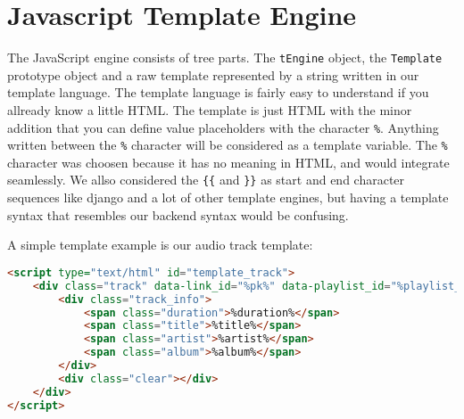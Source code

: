 \section{Javascript Template Engine}

The JavaScript engine consists of tree parts. The 
\lstinline$tEngine$ object, the \lstinline$Template$ prototype object and a raw template represented by a string written in our template language. The template language is fairly easy to understand if you allready know a little HTML. The template is just HTML with the minor addition that you can define value placeholders with the character \verb$%$. Anything written between the \verb$%$ character will be considered as a template variable. The \verb$%$ character was choosen because it has no meaning in HTML, and would integrate seamlessly. We allso considered the \verb${{$ and \verb$}}$ as start and end character sequences like django and a lot of other template engines, but having a template syntax that resembles our backend syntax would be confusing.

A simple template example is our audio track template:
\begin{lstlisting}[language=HTML,caption=The template used to represent audio tracks]
<script type="text/html" id="template_track">
	<div class="track" data-link_id="%pk%" data-playlist_id="%playlist_id%" data-path="%path%">
		<div class="track_info">
			<span class="duration">%duration%</span>
			<span class="title">%title%</span>
			<span class="artist">%artist%</span>
			<span class="album">%album%</span>
		</div>
		<div class="clear"></div>
	</div>
</script>
\end{lstlisting}


